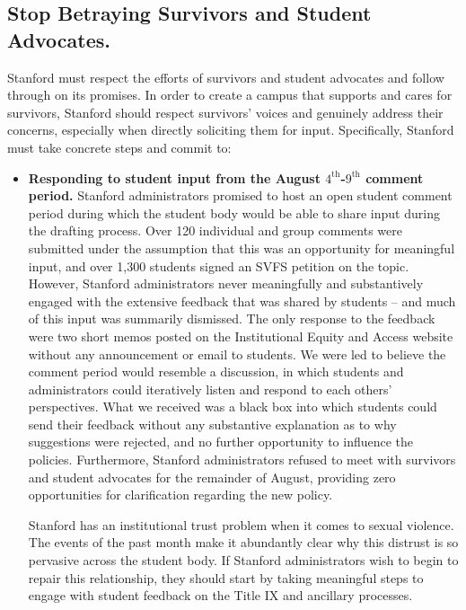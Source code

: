 \documentclass[12pt, titlepage, letterpaper]{article}
\begin{document}
\subsection*{Stop Betraying Survivors and Student Advocates.}
%

Stanford must respect the efforts of survivors and student advocates and follow through on its promises. In order to create a campus that supports and cares for survivors, Stanford should respect survivors’ voices and genuinely address their concerns, especially when directly soliciting them for input. Specifically, Stanford must take concrete steps and commit to:

\begin{itemize}[itemsep=1em]
    \item \textbf{Responding to student input from the August $4^{\mathrm{th}}$-$9^{\mathrm{th}}$ comment period.} Stanford administrators promised to host an open student comment period during which the student body would be able to share input during the drafting process. Over 120 individual and group comments were submitted under the assumption that this was an opportunity for meaningful input, and over 1,300 students signed an SVFS petition on the topic. However, Stanford administrators never meaningfully and substantively engaged with the extensive feedback that was shared by students – and much of this input was summarily dismissed. The only response to the feedback were two short memos posted on the Institutional Equity and Access website without any announcement or email to students. We were led to believe the comment period would resemble a discussion, in which students and administrators could iteratively listen and respond to each others’ perspectives. What we received was a black box into which students could send their feedback without any substantive explanation as to why suggestions were rejected, and no further opportunity to influence the policies. Furthermore, Stanford administrators refused to meet with survivors and student advocates for the remainder of August, providing zero opportunities for clarification regarding the new policy. 
    \vspace{1em}
    
    Stanford has an institutional trust problem when it comes to sexual violence. The events of the past month make it abundantly clear why this distrust is so pervasive across the student body. If Stanford administrators wish to begin to repair this relationship, they should start by taking meaningful steps to engage with student feedback on the Title IX and ancillary processes. 


\end{itemize}
\end{document}
